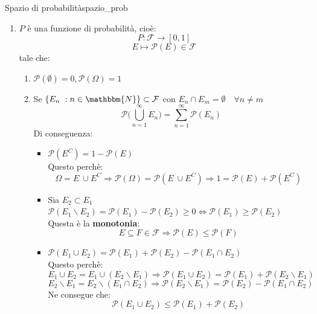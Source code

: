 \documentclass[12pt]{report}
\newcounter{definition}
\newcommand{\nmu}{}
\begin{document}
\begin{definition}{\nmu Spazio di probabilità}{spazio_prob}
\begin{enumerate}
\begin{enumerate}
				Piu' in generale, se $\{E_n\ : n \in \mathbbm{N}\} \subset \mathcal{F} \Rightarrow \mathlarger{\bigcap^\infty_{n=1}}E_n \in \mathcal{F}$
 			\end{enumerate}
 			\textbf{$\mathcal{F}$ è una $\sigma$-algebra se rispecchia le proprietà elencate}.
 			\item $P$ è una funzione di probabilità, cioè:
 			\[
 			P: \mathcal{F} \to [0, 1]
 			\]
 			\[
 			E \mapsto \mathcal{P}(E) \in \mathcal{F}
 			\]
 			tale che:
 			\begin{enumerate}
 				\item $\mathcal{P}(\emptyset) = 0, \mathcal{P}(\Omega) = 1$
 				\item Se $\{E_n\ : n \in \mathbbm{N}\} \subset \mathcal{F}$ con $E_n \cap E_m = \emptyset \quad \forall n \neq m$ \\
 				\[\mathcal{P}\Bigg(\bigcup^\infty_{n=1}E_n\Bigg) = \sum_{n=1}^{\infty}\mathcal{P}(E_n)\]
 				Di conseguenza:
 				\begin{itemize}
 					\item $\mathcal{P}(E^C) = 1 - \mathcal{P}(E)$\\
 					Questo perchè: \[\Omega = E\ \cup E^C \Rightarrow \mathcal{P}(\Omega) = \mathcal{P}(E\ \cup E^C) \Rightarrow 1 = \mathcal{P}(E) + \mathcal{P}(E^C)\]
 					\item Sia $E_2 \subset E_1$ \\ $\mathcal{P}(E_1 \backslash E_2) = \mathcal{P}(E_1) - \mathcal{P}(E_2) \geq 0 \iff \mathcal{P}(E_1) \geq \mathcal{P}(E_2)$ \\
 					Questa è la \textbf{monotonia}: \[E \subseteq F \in \mathcal{F} \Rightarrow \mathcal{P}(E) \leq \mathcal{P}(F)\]
 					\item $\mathcal{P}(E_1 \cup E_2) = \mathcal{P}(E_1) + \mathcal{P}(E_2) - \mathcal{P}(E_1 \cap E_2)$ \\
 					Questo perchè:
 					\[
 					E_1 \cup E_2 = E_1 \cup (E_2 \backslash E_1) \Rightarrow \mathcal{P}(E_1 \cup E_2) = \mathcal{P}(E_1) + \mathcal{P}(E_2 \backslash E_1)
 					\]
 					\[
 					E_2 \backslash E_1 = E_2 \backslash (E_1 \cap E_2) \Rightarrow \mathcal{P}(E_2 \backslash E_1) = \mathcal{P}(E_2) - \mathcal{P}(E_1 \cap E_2)
 					\]
 					Ne consegue che:
 					\[
 					\mathcal{P}(E_1 \cup E_2) \leq \mathcal{P}(E_1) + \mathcal{P}(E_2)
 					\]
 				\end{itemize}
 			\end{enumerate}
		\end{enumerate}
	\end{definition}
\end{document}
